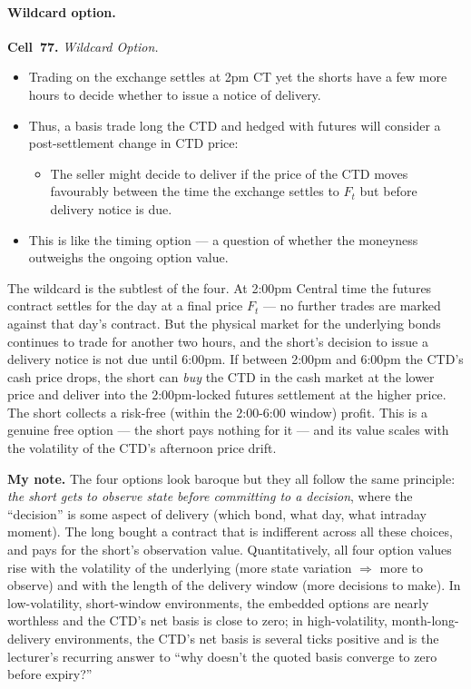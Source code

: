 \paragraph{Wildcard option.}
\begin{keyblock}
\textbf{Cell~77.} \emph{Wildcard Option.}\\
\begin{itemize}
  \item Trading on the exchange settles at 2pm CT yet the shorts have a
        few more hours to decide whether to issue a notice of delivery.
  \item Thus, a basis trade long the CTD and hedged with futures will
        consider a post-settlement change in CTD price:
        \begin{itemize}
          \item The seller might decide to deliver if the price of the
                CTD moves favourably between the time the exchange settles
                to $F_t$ but before delivery notice is due.
        \end{itemize}
  \item This is like the timing option --- a question of whether the
        moneyness outweighs the ongoing option value.
\end{itemize}
\end{keyblock}

The wildcard is the subtlest of the four. At 2:00pm Central time the
futures contract settles for the day at a final price $F_t$ --- no further
trades are marked against that day's contract. But the physical market for
the underlying bonds continues to trade for another two hours, and the
short's decision to issue a delivery notice is not due until 6:00pm. If
between 2:00pm and 6:00pm the CTD's cash price drops, the short can
\emph{buy} the CTD in the cash market at the lower price and deliver into
the 2:00pm-locked futures settlement at the higher price. The short
collects a risk-free (within the 2:00-6:00 window) profit. This is a
genuine free option --- the short pays nothing for it --- and its value
scales with the volatility of the CTD's afternoon price drift.

\begin{checkpoint}
\textbf{My note.} The four options look baroque but they all follow the
same principle: \emph{the short gets to observe state before committing to
a decision}, where the ``decision'' is some aspect of delivery (which
bond, what day, what intraday moment). The long bought a contract that is
indifferent across all these choices, and pays for the short's observation
value. Quantitatively, all four option values rise with the volatility of
the underlying (more state variation $\Rightarrow$ more to observe) and
with the length of the delivery window (more decisions to make). In
low-volatility, short-window environments, the embedded options are
nearly worthless and the CTD's net basis is close to zero; in
high-volatility, month-long-delivery environments, the CTD's net basis
is several ticks positive and is the lecturer's recurring answer to
``why doesn't the quoted basis converge to zero before expiry?''
\end{checkpoint}

